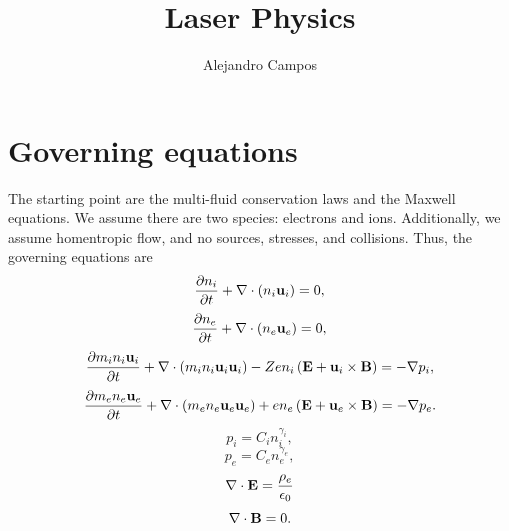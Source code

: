 \documentclass[a4paper,11pt]{report}
\title{Laser Physics}
\author{Alejandro Campos}
\begin{document}
\maketitle
\tableofcontents

\chapter{Governing equations}
The starting point are the multi-fluid conservation laws and the Maxwell equations. We assume there are two species: electrons and ions. Additionally, we assume homentropic flow, and no sources, stresses, and collisions. Thus, the governing equations are
\begin{equation}
    \label{eq:pwaves_ion_density}
    \frac{\partial n_i}{\partial t} + \nabla \cdot \left (n_i \mathbf{u}_i \right ) = 0,
\end{equation}
\begin{equation}
    \label{eq:pwaves_electron_density}
    \frac{\partial n_e}{\partial t} + \nabla \cdot \left (n_e \mathbf{u}_e \right ) = 0,
\end{equation}
\begin{equation}
    \label{eq:pwaves_ion_momentum}
    \frac{\partial m_i n_i \mathbf{u}_i}{\partial t} + \nabla \cdot \left ( m_i n_i \mathbf{u}_i \mathbf{u}_i \right ) - Ze n_i \left ( \mathbf{E} + \mathbf{u}_i \times \mathbf{B} \right ) = -\nabla p_i,
\end{equation}
\begin{equation}
    \label{eq:pwaves_electron_momentum}
    \frac{\partial m_e n_e \mathbf{u}_e}{\partial t} + \nabla \cdot \left ( m_e n_e \mathbf{u}_e \mathbf{u}_e \right ) + e n_e \left ( \mathbf{E} + \mathbf{u}_e \times \mathbf{B} \right ) = -\nabla p_e.
\end{equation}
\begin{equation}
    p_i = C_i n_i^{\gamma_i},
\end{equation}
\begin{equation}
    p_e = C_e n_e^{\gamma_e},
\end{equation}
\begin{equation}
    \label{eq:pwaves_maxwell_3}
    \nabla \cdot \mathbf{E} = \frac{\rho_e}{\epsilon_0} 
\end{equation}
\begin{equation}
    \label{eq:p_waves_maxwell_4}
    \nabla \cdot \mathbf{B} = 0.
\end{equation}
\end{document}
